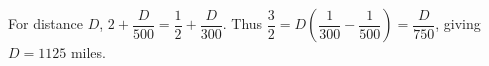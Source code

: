 For distance $D$, $2+\dfrac{D}{500}=\dfrac{1}{2}+\dfrac{D}{300}$. Thus $\dfrac{3}{2}=D(\dfrac{1}{300}-\dfrac{1}{500})=\dfrac{D}{750}$, giving $D=\boxed{1125}$ miles.
